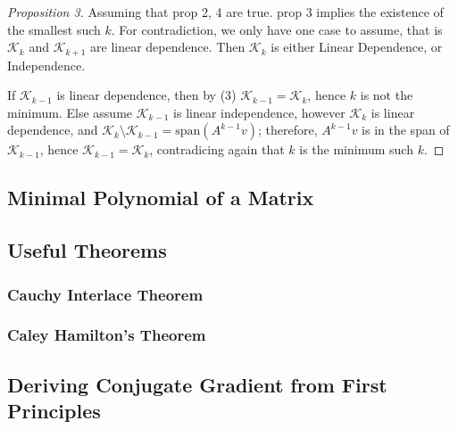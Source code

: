 \documentclass[]{article}
\theoremstyle{definition}
\begin{document}
            \begin{proof}[Proposition 3]
                Assuming that prop 2, 4 are true. prop 3 implies the existence of the smallest such $k$. For contradiction, we only have one case to assume, that is $\mathcal K_k$ and $\mathcal K_{k + 1}$ are linear dependence. Then $\mathcal K_k$ is either Linear Dependence, or Independence. 
                \par
                If $\mathcal K_{k - 1}$ is linear dependence, then by (3) $\mathcal K_{k - 1} = \mathcal K_k$, hence $k$ is not the minimum. Else assume $\mathcal K_{k - 1}$ is linear independence, however $\mathcal K_k$ is linear dependence, and $\mathcal K_k \setminus \mathcal K_{k - 1} = \text{span}(A^{k - 1}v)$; therefore, $A^{k -1}v$ is in the span of $\mathcal K_{k -1}$, hence $\mathcal K_{k -1} = \mathcal K_k$, contradicing again that $k$ is the minimum such $k$. 
            \end{proof}
    \subsection{Minimal Polynomial of a Matrix}
    \subsection{Useful Theorems}
        \subsubsection{Cauchy Interlace Theorem}
        \subsubsection{Caley Hamilton's Theorem}
    \subsection{Deriving Conjugate Gradient from First Principles}
\end{document}
